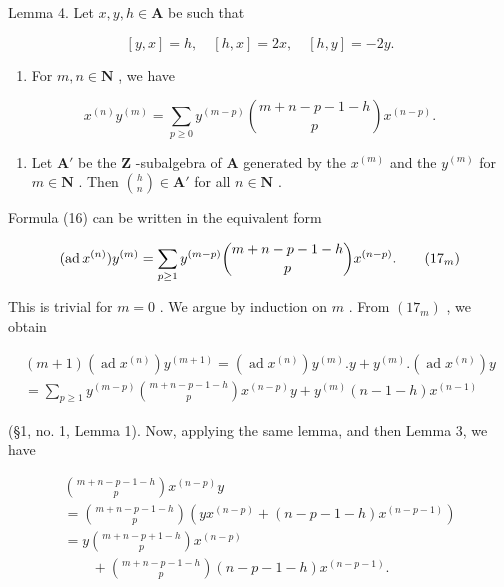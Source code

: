 Lemma 4. Let \(x, y, h \in \mathbf{A}\) be such that

\[
[ y, x ] = h, \quad [ h, x ] = 2 x, \quad [ h, y ] = - 2 y.\tag{15}
\]

\begin{enumerate}
\def\labelenumi{(\roman{enumi})}
\tightlist
\item
  For \(m, n \in \mathbf{N}\) , we have
\end{enumerate}

\[
x ^ {(n)} y ^ {(m)} = \sum_ {p \geq 0} y ^ {(m - p)} \binom{m + n - p - 1 - h}{p} x ^ {(n - p)}.\tag{16}
\]

\begin{enumerate}
\def\labelenumi{(\roman{enumi})}
\setcounter{enumi}{1}
\tightlist
\item
  Let \(\mathbf{A}'\) be the \(\mathbf{Z}\) -subalgebra of \(\mathbf{A}\) generated by the \(x^{(m)}\) and the \(y^{(m)}\) for \(m \in \mathbf{N}\) . Then \(\binom{h}{n} \in \mathbf{A}'\) for all \(n \in \mathbf{N}\) .
\end{enumerate}

Formula (16) can be written in the equivalent form

\[
(\operatorname{ad} x ^ {(n)}) y ^ {(m)} = \sum_ {p \geq 1} y ^ {(m - p)} \binom {m + n - p - 1 - h} {p} x ^ {(n - p)}.\tag{$17_{m}$}
\]

This is trivial for \(m = 0\) . We argue by induction on \(m\) . From \((17_{m})\) , we obtain

\[
\begin{array}{l} (m + 1) (\operatorname{ad} x ^ {(n)}) y ^ {(m + 1)} = (\operatorname{ad} x ^ {(n)}) y ^ {(m)}. y + y ^ {(m)}. (\operatorname{ad} x ^ {(n)}) y \\ = \sum_ {p \geq 1} y ^ {(m - p)} \binom {m + n - p - 1 - h} {p} x ^ {(n - p)} y + y ^ {(m)} (n - 1 - h) x ^ {(n - 1)} \end{array} \tag {18}
\]

(§1, no. 1, Lemma 1). Now, applying the same lemma, and then Lemma 3, we have

\[
\begin{array}{l} \binom {m + n - p - 1 - h} {p} x ^ {(n - p)} y \\ = \binom {m + n - p - 1 - h} {p} (y x ^ {(n - p)} + (n - p - 1 - h) x ^ {(n - p - 1)}) \\ = y \binom {m + n - p + 1 - h} {p} x ^ {(n - p)} \\ \qquad + \binom {m + n - p - 1 - h} {p} (n - p - 1 - h) x ^ {(n - p - 1)}. \end{array}
\]

